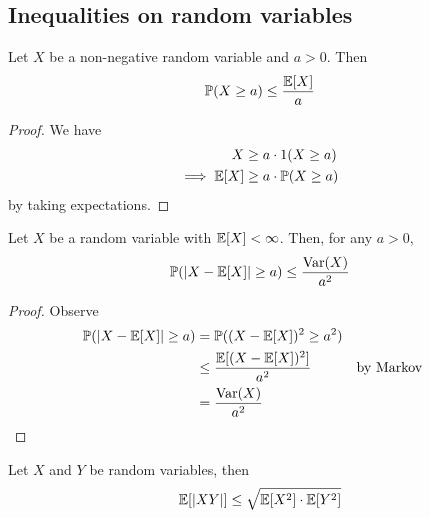 \documentclass{../../template/note}
\begin{document}
    \subsection{Inequalities on random variables}

    \begin{proposition}
        Let \(X\) be a non-negative random variable and \(a > 0\). Then
        \begin{align*}
            \mathbb P(X \geq a) \leq \frac{\mathbb E[X]}{a}
        \end{align*}
    \end{proposition}
    
    \begin{proof}
        We have
        \begin{align*}
            X &\geq a \cdot 1(X \geq a) \\
            \implies \mathbb E[X] &\geq a \cdot \mathbb P(X \geq a)
        \end{align*}
        by taking expectations.
    \end{proof}
    
    \begin{proposition}
        Let \(X\) be a random variable with \(\mathbb E[X] < \infty\). Then, for any \(a > 0\),
        \begin{align*}
            \mathbb P(|X - \mathbb E[X]| \geq a) \leq \frac{\operatorname{Var}(X)}{a^2}
        \end{align*}
    \end{proposition}
    
    \begin{proof}
        Observe
        \begin{align*}
            \mathbb P(|X-\mathbb E[X]| \geq a) &= \mathbb P((X-\mathbb E[X])^2 \geq a^2) \\
            &\leq \frac{\mathbb E[(X-\mathbb E[X])^2]}{a^2} && \text{by Markov}\\
            &= \frac{\operatorname{Var}(X)}{a^2}
        \end{align*}
    \end{proof}
    
    \begin{proposition}
        Let \(X\) and \(Y\) be random variables, then
        \begin{align*}
            \mathbb E[|XY|] \leq \sqrt{\mathbb E[X^2] \cdot \mathbb E[Y^2]}
        \end{align*}
    \end{proposition}
    
\end{document}
